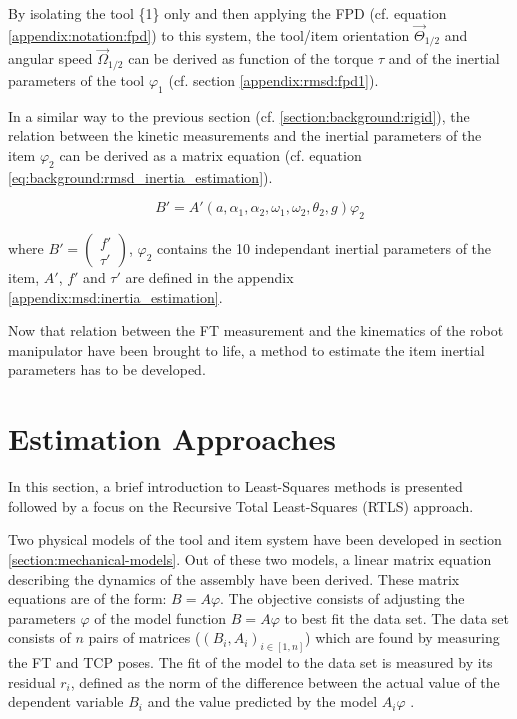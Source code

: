 \documentclass[/home/francois/latex/report/main.tex]{subfiles}
\begin{document}
 By isolating the tool \{1\} only and then applying the \ac{FPD} (cf. equation \ref{appendix:notation:fpd}) to this system, the tool/item orientation $\overrightarrow{\Theta}_{1/2}$ and angular speed $\overrightarrow{\Omega}_{1/2}$ can be derived as function of the torque $\tau$ and of the inertial parameters of the tool $\varphi_1$ (cf. section \ref{appendix:rmsd:fpd1}).

 In a similar way to the previous section (cf. \ref{section:background:rigid}), the relation between the kinetic measurements and the inertial parameters of the item $\varphi_2$ can be derived as a matrix equation (cf. equation \ref{eq:background:rmsd_inertia_estimation}).

 \begin{equation}
   \label{eq:background:rmsd_inertia_estimation}
 B' = A'(a, \alpha_1, \alpha_2, \omega_1, \omega_2, \theta_2, g) \varphi_2
 \end{equation}

 where  $B' = \begin{pmatrix} f' \\ \tau' \end{pmatrix}$, $\varphi_2$ contains the 10 independant inertial parameters of the item, $A'$, $f'$ and $\tau'$ are defined in the appendix \ref{appendix:msd:inertia_estimation}.

Now that relation between the \ac{FT} measurement and the kinematics of the robot manipulator have been brought to life, a method to estimate the item inertial parameters has to be developed.

\section{Estimation Approaches}
\label{section:estimation}

In this section, a brief introduction to Least-Squares methods is presented followed by a focus on the Recursive Total Least-Squares (RTLS) approach.

Two physical models of the tool and item system have been developed in section \ref{section:mechanical-models}. Out of these two models, a linear matrix equation describing the dynamics of the assembly have been derived. These matrix equations are of the form: $B = A\varphi$. The objective consists of adjusting the parameters $\varphi$ of the model function $B = A\varphi$ to best fit the data set. The data set consists of $n$ pairs of matrices ($(B_i, A_i)_{i \in [1, n]}$) which are found by measuring the \ac{FT} and \ac{TCP} poses. The fit of the model to the data set is measured by its residual $r_i$, defined as the norm of the difference between the actual value of the dependent variable $B_i$ and the value predicted by the model $A_i \varphi$ \cite{Simoncelli2003}.
\end{document}
